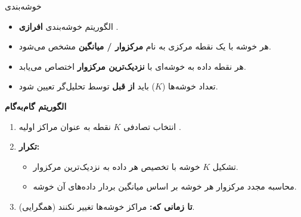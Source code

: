 \begin{frame}{خوشه‌بندی }{}
  \begin{itemize}
    \setlength{\itemsep}{4pt}
    \item الگوریتم خوشه‌بندی \textbf{افرازی} .
    \item هر خوشه با یک نقطه مرکزی به نام \textbf{مرکزوار / میانگین}  مشخص می‌شود.
    \item هر نقطه داده به خوشه‌ای با \textbf{نزدیک‌ترین مرکزوار} اختصاص می‌یابد.
    \item تعداد خوشه‌ها ($K$) باید \textbf{از قبل} توسط تحلیل‌گر تعیین شود.
  \end{itemize}

  \vspace{0.2cm}
  \begin{block}{\textbf{الگوریتم گام‌به‌گام } }
    \begin{enumerate}
      \setlength{\itemsep}{2pt}
      \item انتخاب تصادفی $K$ نقطه به عنوان مراکز اولیه .
      \item \textbf{تکرار:} 
      \begin{itemize}
        \item تشکیل $K$ خوشه با تخصیص هر داده به نزدیک‌ترین مرکزوار.
        \item محاسبه مجدد مرکزوار هر خوشه بر اساس میانگین بردار داده‌های آن خوشه.
      \end{itemize}
      \item \textbf{تا زمانی که:}  مراکز خوشه‌ها تغییر نکنند (همگرایی).
    \end{enumerate}
  \end{block}
\end{frame}

